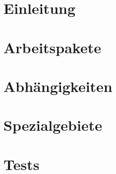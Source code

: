 \documentclass[a4paper,11pt]{article}
\begin{document}

    \tableofcontents


    \newpage

    \section{Einleitung}\label{sec:einleitung}
    

    \section{Arbeitspakete}\label{sec:arbeitspakete}
    

    \section{Abhängigkeiten}\label{sec:abhaengigkeiten}
    

    \section{Spezialgebiete}\label{sec:spezialgebiete}
    
    \newpage
    \section{Tests}\label{sec:tests}
    
\end{document}
